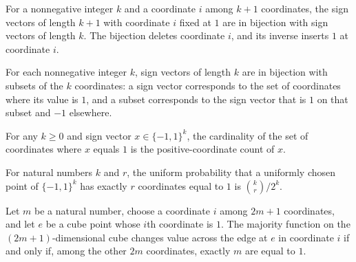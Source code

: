 \begin{definition}
\label{FABL.dimensionEdgeRemoveEquiv}
\leanok
{}
For a nonnegative integer $k$ and a coordinate $i$ among $k+1$ coordinates, the sign
vectors of length $k+1$ with coordinate $i$ fixed at $1$ are in bijection with sign
vectors of length $k$. The bijection deletes coordinate $i$, and its inverse inserts $1$
at coordinate $i$.
\end{definition}

\begin{definition}
\label{FABL.signCubeEquivFinset}
\leanok
{}
For each nonnegative integer $k$, sign vectors of length $k$ are in bijection with
subsets of the $k$ coordinates: a sign vector corresponds to the set of coordinates
where its value is $1$, and a subset corresponds to the sign vector that is $1$ on that
subset and $-1$ elsewhere.
\end{definition}

\begin{theorem}
\label{FABL.signCubeEquivFinset_apply_card}
\leanok
{}
For any $k\ge 0$ and sign vector $x\in\{−1,1\}^k$, the cardinality of the set of
coordinates where $x$ equals $1$ is the positive-coordinate count of $x$.
\end{theorem}

\begin{theorem}
\label{FABL.uniformProbability_positiveCoordinateCount_eq}
\leanok
{}
For natural numbers $k$ and $r$, the uniform probability that a uniformly chosen point
of $\{−1,1\}^k$ has exactly $r$ coordinates equal to $1$ is $\binom{k}{r}/2^k$.
\end{theorem}

\begin{theorem}
\label{FABL.isBoundaryDimensionEdge_majority_odd_iff}
\leanok
{}
Let $m$ be a natural number, choose a coordinate $i$ among $2m+1$ coordinates, and let
$e$ be a cube point whose $i$th coordinate is $1$. The majority function on the
$(2m+1)$-dimensional cube changes value across the edge at $e$ in coordinate $i$ if and
only if, among the other $2m$ coordinates, exactly $m$ are equal to $1$.
\end{theorem}

